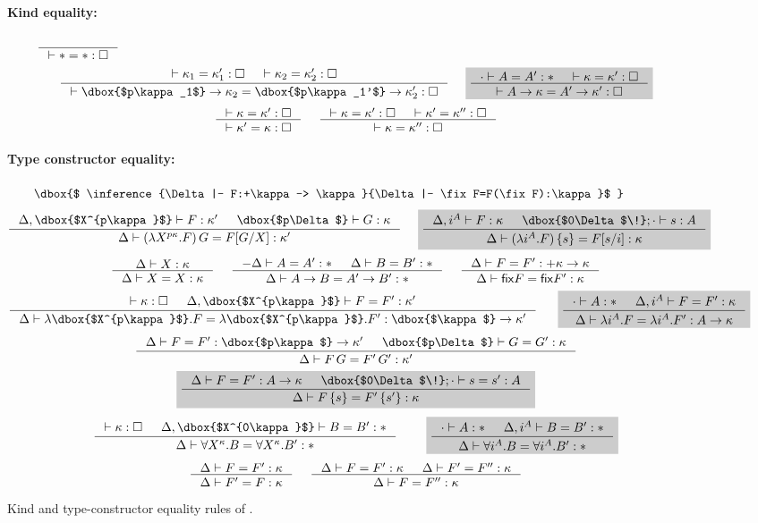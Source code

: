 \begin{figure}\begin{singlespace}\small
\paragraph{Kind equality:} 
$ \quad
 ~~~~
   \inference{}{|- * = *:\square} $
\[
   \inference{ |- \kappa_1 = \kappa_1' : \square
             & |- \kappa_2 = \kappa_2' : \square }{
   |- \dbox{$p\kappa_1$}-> \kappa_2 = \dbox{$p\kappa_1'$}-> \kappa_2' : \square}
 ~~~~ \newFi{
   \inference{\cdot |- A=A':* & |- \kappa=\kappa':\square}{
              |- A -> \kappa = A' -> \kappa' : \square} }
\]
\[ \inference{|- \kappa=\kappa':\square}{
              |- \kappa'=\kappa:\square}
 ~~~~
   \inference{ |- \kappa =\kappa' :\square
             & |- \kappa'=\kappa'':\square}{
              |- \kappa=\kappa'':\square}
\]
\paragraph{Type constructor equality:} 
$\qquad \dbox{$
  \inference{\Delta|- F:+\kappa-> \kappa}{\Delta|- \fix F=F(\fix F):\kappa}$ } $
\[
   \inference{ \Delta,\dbox{$X^{p\kappa}$} |- F:\kappa'
   	     & \dbox{$p\Delta$} |- G:\kappa}{
	      \Delta |- (\lambda X^{p\kappa}.F)\,G = F[G/X]:\kappa'}
 ~~~~ \newFi{
   \inference{ \Delta,i^A |- F:\kappa
             & \dbox{$0\Delta$\!};\cdot |- s:A}{
              \Delta |- (\lambda i^A.F)\,\{s\} = F[s/i]:\kappa} }
\]
\[ \inference{\Delta |- X:\kappa }{\Delta |- X=X:\kappa}
 ~~~~
   \inference{-\Delta |- A=A':* & \Delta |- B=B':*}{\Delta |- A-> B=A'-> B':*}
 ~~~~
   \inference{\Delta |- F=F' : +\kappa -> \kappa}{
	      \Delta |- \fix F = \fix F' : \kappa}
\]
\[
   \inference{ |- \kappa:\square
   	     & \Delta,\dbox{$X^{p\kappa}$} |- F=F' : \kappa'}{
   	\Delta |- \lambda \dbox{$X^{p\kappa}$}.F
		= \lambda \dbox{$X^{p\kappa}$}.F': \dbox{$\kappa$} -> \kappa'}
 ~~~~ ~
 \newFi{
   \inference{\cdot |- A:* & \Delta,i^A |- F=F' : \kappa}{
	      \Delta |- \lambda i^A.F=\lambda i^A.F' : A -> \kappa} }
\]
\[
   \inference{ \Delta |- F=F' : \dbox{$p\kappa$} -> \kappa'
   	     & \dbox{$p\Delta$} |- G=G':\kappa}{
              \Delta |- F\,G = F'\,G' : \kappa'}
\]
\[
 \newFi{
   \inference{ \Delta |- F=F': A -> \kappa
             & \dbox{$0\Delta$\!};\cdot |- s=s':A}{
	      \Delta |- F\,\{s\} = F'\,\{s'\} : \kappa} }
\]
\[
   \inference{ |- \kappa:\square
   	     & \Delta,\dbox{$X^{0\kappa}$} |- B=B':*}{
              \Delta |- \forall X^\kappa.B=\forall X^\kappa.B':*}
 ~~~~ \quad
 \newFi{
   \inference{\cdot |- A:* & \Delta,i^A |- B=B':*}{
              \Delta |- \forall i^A.B=\forall i^A.B':*} }
\]
\[ \inference{\Delta |- F = F' : \kappa}{\Delta |- F' = F : \kappa}
 ~~~~
   \inference{\Delta |- F = F' : \kappa & \Delta |- F' = F'' : \kappa}{
              \Delta |- F = F'' : \kappa}
\]
\end{singlespace}
\caption{Kind and type-constructor equality rules of \Fixi.}
\label{fig:eqFixi}
\end{figure}

